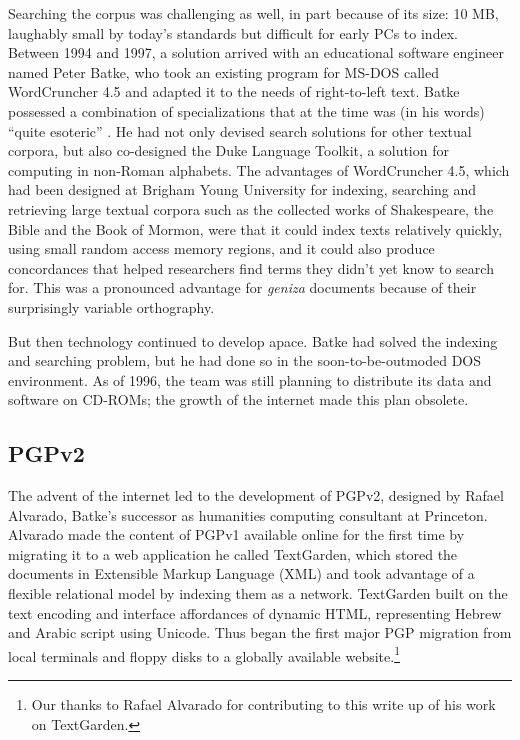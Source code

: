 \documentclass{article}
\begin{document}
Searching the corpus was challenging as well, in part because of its size: 10 MB, laughably small by today’s standards but difficult for early PCs to index. Between 1994 and 1997, a solution arrived with an educational software engineer named Peter Batke, who took an existing program for MS-DOS called WordCruncher 4.5 and adapted it to the needs of right-to-left text. Batke possessed a combination of specializations that at the time was (in his words) “quite esoteric” \autocite{noauthor_background_nodate}. He had not only devised search solutions for other textual corpora, but also co-designed the Duke Language Toolkit, a solution for computing in non-Roman alphabets. The advantages of WordCruncher 4.5, which had been designed at Brigham Young University for indexing, searching and retrieving large textual corpora such as the collected works of Shakespeare, the Bible and the Book of Mormon, were that it could index texts relatively quickly, using small random access memory regions, and it could also produce concordances that helped researchers find terms they didn’t yet know to search for. This was a pronounced advantage for \textit{geniza} documents because of their surprisingly variable orthography. 

But then technology continued to develop apace. Batke had solved the indexing and searching problem, but he had done so in the soon-to-be-outmoded DOS environment. As of 1996, the team was still planning to distribute its data and software on CD-ROMs; the growth of the internet made this plan obsolete.

\subsection{PGPv2}

The advent of the internet led to the development of PGPv2, designed by Rafael Alvarado, Batke’s successor as humanities computing consultant at Princeton. Alvarado made the content of PGPv1 available online for the first time by migrating it to a web application he called TextGarden, which stored the documents in Extensible Markup Language (XML) and took advantage of a flexible relational model by indexing them as a network. TextGarden built on the text encoding and interface affordances of dynamic HTML, representing Hebrew and Arabic script using Unicode. Thus began the first major PGP migration from local terminals and floppy disks to a globally available website.\footnote{ Our thanks to Rafael Alvarado for contributing to this write up of his work on TextGarden.} 
\end{document}
